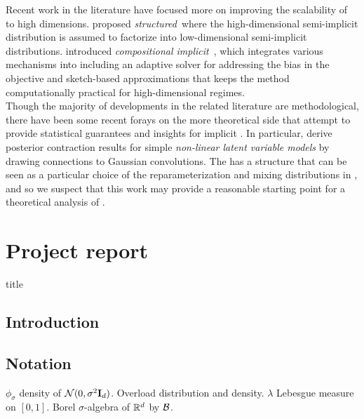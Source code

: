 \documentclass[10pt]{article}
\begin{document}
Recent work in the literature have focused more on improving the scalability of \sivi to high dimensions. \citet{Molchanova:2019} proposed \textit{structured}~\sivi where the high-dimensional semi-implicit distribution is assumed to factorize into low-dimensional semi-implicit distributions. \citet{Moens:2021} introduced \textit{compositional implicit}~\vi, which integrates various mechanisms into \sivi including an adaptive solver for addressing the bias in the \sivi objective and sketch-based approximations that keeps the method computationally practical for high-dimensional regimes.
\\

Though the majority of developments in the related literature are methodological, there have been some recent forays on the more theoretical side that attempt to provide statistical guarantees and insights for implicit \vi. In particular, \citet{Plummer:2021} derive posterior contraction results for simple \textit{non-linear latent variable models} by drawing connections to Gaussian convolutions. The \nllvm has a structure that can be seen as a particular choice of the reparameterization and mixing distributions in \uivi, and so we suspect that this work may provide a reasonable starting point for a theoretical analysis of \uivi.


\newpage


\section{Project report}

\todo title

\vspace{2em}
\begin{abstract}
\todo
\end{abstract}
\vspace{2em}

\subsection{Introduction}

\subsection{Notation}

\todo $\phi_\sigma$ density of $\mathcal{N}(0,\sigma^2\mathbf{I}_d)$. Overload distribution and density. $\lambda$ Lebesgue measure on $[0,1]$. Borel $\sigma$-algebra of $\mathbb{R}^d$ by $\mathcal{B}$.
\end{document}
